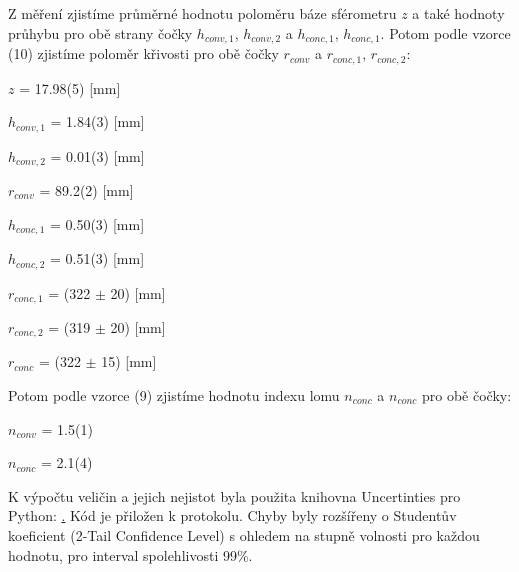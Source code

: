 \documentclass[a4paper,11pt]{article}
\begin{document}
    \begin{minipage}[t]{0.5\textwidth}
                \par Z měření zjistíme průměrné hodnotu poloměru báze sférometru $z$ a také hodnoty průhybu pro obě strany čočky $h_{conv, 1}$, $h_{conv, 2}$ a $h_{conc, 1}$, $h_{conc, 1}$. Potom podle vzorce (10) zjistíme poloměr křivosti pro obě čočky $r_{conv}$ a $r_{conc, 1}$, $r_{conc, 2}$:
                \begin{center}
                    $z$ = 17.98(5) [mm]
                    \vspace{15pt}
                    \par $h_{conv, 1}$ = 1.84(3) [mm]
                    \vspace{5pt}
                    \par $h_{conv, 2}$ = 0.01(3) [mm]
                    \vspace{5pt}
                    \par $r_{conv}$ = 89.2(2) [mm]
                    \vspace{15pt}
                    \par $h_{conc, 1}$ = 0.50(3) [mm]
                    \vspace{5pt}
                    \par $h_{conc, 2}$ = 0.51(3) [mm]
                    \vspace{5pt}
                    \par $r_{conc, 1}$ = (322 $\pm$ 20) [mm]
                    \vspace{5pt}
                    \par $r_{conc, 2}$ = (319 $\pm$ 20) [mm]
                    \vspace{5pt}
                    \par $r_{conc}$ = (322 $\pm$ 15) [mm]
                \end{center}
                Potom podle vzorce (9) zjistíme hodnotu indexu lomu $n_{conc}$ a $n_{conc}$ pro obě čočky: 
                \begin{center}
                    $n_{conv}$ = 1.5(1)
                    \vspace{5pt}
                    \par $n_{conc}$ = 2.1(4)
                \end{center}
                \vspace{10pt}
                K výpočtu veličin a jejich nejistot byla použita knihovna Uncertinties pro Python: \href{pypi.org/project/uncertainties}. Kód je přiložen k protokolu. Chyby byly rozšířeny o Studentův koeficient (2-Tail Confidence Level) s ohledem na stupně volnosti pro každou hodnotu, pro interval spolehlivosti 99\%. 
    \end{minipage}
\end{document}
